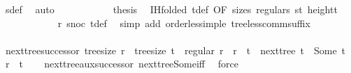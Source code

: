 \begin{isabellebody}
\ s{\isacharprime}{\kern0pt}{\isacharprime}{\kern0pt}{\isacharunderscore}{\kern0pt}def\ \isamarkupfalse%
\ auto\isanewline
\ \ \ \ \ \ \ \ \isamarkupfalse%
\ \isamarkupfalse%
\ {\isacharquery}{\kern0pt}thesis\ \isamarkupfalse%
\ {\isachardoublequoteopen}{}{\isachardot}{\kern0pt}IH{\isachardoublequoteclose}{\isacharbrackleft}{\kern0pt}folded\ t{\isacharunderscore}{\kern0pt}def{\isacharcomma}{\kern0pt}\ OF\ size{\isacharunderscore}{\kern0pt}s{\isacharprime}{\kern0pt}{\isacharprime}{\kern0pt}\ regular{\isacharunderscore}{\kern0pt}s{\isacharprime}{\kern0pt}{\isacharprime}{\kern0pt}\ {\isacartoucheopen}s{\isacharprime}{\kern0pt}{\isacharprime}{\kern0pt}{\isacharless}{\kern0pt}t{\isacartoucheclose}\ height{\isacharunderscore}{\kern0pt}t{\isacharbrackright}{\kern0pt}\isanewline
\ \ \ \ \ \ \ \ \ \ \isamarkupfalse%
\ r\ snoc\ t{\isacharunderscore}{\kern0pt}def\ \isamarkupfalse%
\ {\isacharparenleft}{\kern0pt}simp\ add{\isacharcolon}{\kern0pt}\ order{\isacharunderscore}{\kern0pt}less{\isacharunderscore}{\kern0pt}imp{\isacharunderscore}{\kern0pt}le\ tree{\isacharunderscore}{\kern0pt}less{\isacharunderscore}{\kern0pt}comm{\isacharunderscore}{\kern0pt}suffix{}{\isacharparenright}{\kern0pt}\isanewline
\ \ \ \ \ \ \isamarkupfalse%
\isanewline
\ \ \ \ \isamarkupfalse%
\isanewline
\ \ \isamarkupfalse%
\isanewline
{}\isamarkupfalse%
%
\endisatagproof
{\isafoldproof}%
%
\isadelimproof
\isanewline
%
\endisadelimproof
\isanewline
{}\isamarkupfalse%
\ next{\isacharunderscore}{\kern0pt}tree{\isacharunderscore}{\kern0pt}successor{\isacharcolon}{\kern0pt}\ {\isachardoublequoteopen}tree{\isacharunderscore}{\kern0pt}size\ r\ {\isacharequal}{\kern0pt}\ tree{\isacharunderscore}{\kern0pt}size\ t\ {\isasymLongrightarrow}\ regular\ r\ {\isasymLongrightarrow}\ r\ {\isacharless}{\kern0pt}\ t\ {\isasymLongrightarrow}\ next{\isacharunderscore}{\kern0pt}tree\ t\ {\isacharequal}{\kern0pt}\ Some\ t{\isacharprime}{\kern0pt}\ {\isasymLongrightarrow}\ r\ {\isasymle}\ t{\isacharprime}{\kern0pt}{\isachardoublequoteclose}\isanewline
%
\isadelimproof
\ \ %
\endisadelimproof
%
\isatagproof
{}\isamarkupfalse%
\ next{\isacharunderscore}{\kern0pt}tree{\isacharunderscore}{\kern0pt}aux{\isacharunderscore}{\kern0pt}successor\ next{\isacharunderscore}{\kern0pt}tree{\isacharunderscore}{\kern0pt}Some{\isacharunderscore}{\kern0pt}iff\ \isamarkupfalse%
\ force%
\endisatagproof

\end{isabellebody}
